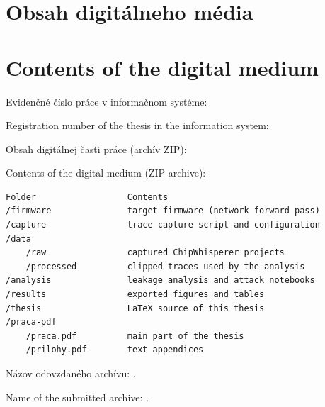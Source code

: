 \thispagestyle{empty}

\ifx\FIITlagEN\undefined
\chapter{Obsah digitálneho média}
\else
\chapter{Contents of the digital medium}
\fi

\renewcommand*{\thepage}{C-\arabic{page}}

\ifx\FIITlagEN\undefined
\par Evidenčné číslo práce v informačnom systéme: \FIITevidenceNumber
\else
\par Registration number of the thesis in the information system: \FIITevidenceNumber
\fi

\ifx\FIITlagEN\undefined
\par Obsah digitálnej časti práce (archív ZIP):
\else
\par Contents of the digital medium (ZIP archive):
\fi

\begin{verbatim}
Folder                  Contents
/firmware               target firmware (network forward pass)
/capture                trace capture script and configuration
/data
    /raw                captured ChipWhisperer projects
    /processed          clipped traces used by the analysis
/analysis               leakage analysis and attack notebooks
/results                exported figures and tables
/thesis                 LaTeX source of this thesis
/praca-pdf
    /praca.pdf          main part of the thesis
    /prilohy.pdf        text appendices
\end{verbatim}



\ifx\FIITlagEN\undefined
\par Názov odovzdaného archívu: \FIITArchiveName.
\else
\par Name of the submitted archive: \FIITArchiveName.
\fi
